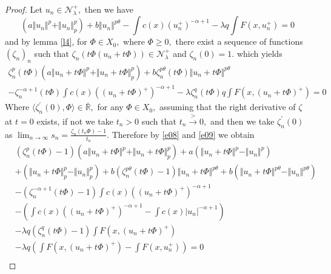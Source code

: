 \documentclass[10pt,a4paper]{amsart}
\begin{document}
\begin{proof}
Let $ u_n \in \mathcal{N}_{\lambda}^{+},$ then we have
\begin{equation}\label{e08}
\left( a \Vert u_n \Vert^p + \Vert u_n \Vert_{p}^{p}\right) + b \Vert u_n \Vert^{p \theta}  - \int c(x)(u_n^+)^{-\alpha+1} - \lambda q \int F(x,u_n^+) = 0 
\end{equation}
and by lemma \ref{l4}, for $ \Phi \in X_0,$ where $ \Phi \geq 0,$ there exist a sequence of functions $ (\zeta_n)_n$ such that 
$ \zeta_n(t\Phi(u_n +t\Phi)) \in \mathcal{N}_{\lambda}^{+}$ and $ \zeta_n(0) =1.$ which yields
\begin{equation}\label{e09}
\begin{split}
\zeta_n^{p}(t\Phi) \left( a \Vert u_n +t\Phi \Vert^p + \Vert u_n +t\Phi \Vert_{p}^{p}\right) + b \zeta_n^{p\theta}(t\Phi) \Vert u_n +t\Phi \Vert^{p \theta}\\ 
-\zeta_n^{-\alpha+1}(t\Phi) \int c(x)((u_n +t\Phi)^+)^{-\alpha+1} - \lambda \zeta_n^{q}(t\Phi) q \int F(x,(u_n +t\Phi)^+) = 0 
\end{split}
\end{equation} 
Where $ \langle\zeta_n^{\prime}(0), \Phi\rangle \in \bar{\mathbb{R}},$ for any $ \Phi \in X_0,$ assuming that the right derivative of $ \zeta$ at $ t =0$ exists,
if not we take $ t_n >0$ such that $ t_n \xrightarrow{>} 0,$ and then we take $ \zeta_n^{\prime}(0)$ as $ \lim_{n \to \infty} s_n =\frac{\zeta_n(t_n\Phi) -1}{t_n}.$ Therefore by \ref{e08} and \ref{e09} we obtain
\begin{equation}
\begin{aligned}
&(\zeta_n^{p}(t\Phi) -1) \left(a\Vert u_n +t\Phi \Vert^p + \Vert u_n +t\Phi \Vert_{p}^{p}\right)+a\left(\Vert u_n +t\Phi \Vert^p -\Vert u_n \Vert^p\right)\\ 
& +\left(\Vert u_n +t\Phi \Vert_{p}^{p}-\Vert u_n \Vert_{p}^{p}\right) +b (\zeta_n^{p\theta}(t\Phi) -1) \Vert u_n +t\Phi \Vert^{p \theta}  +b\left(\Vert u_n +t\Phi \Vert^{p \theta} -\Vert u_n \Vert^{p \theta}\right)\\
&-(\zeta_n^{-\alpha+1}(t\Phi) -1)\int c(x)((u_n +t\Phi)^+)^{-\alpha+1}\\
&-\left(\int c(x)((u_n +t\Phi)^+)^{-\alpha+1} -\int c(x)\vert u_n\vert^{-\alpha+1}\right)\\
&-\lambda q (\zeta_n^{q}(t\Phi) -1) \int F(x,(u_n +t\Phi)^+)\\
& -\lambda q \left(\int F(x,(u_n +t\Phi)^+) -\int F(x,u_n^+)\right) =0\\
\end{aligned}

\end{equation}
\end{proof}
\end{document}
